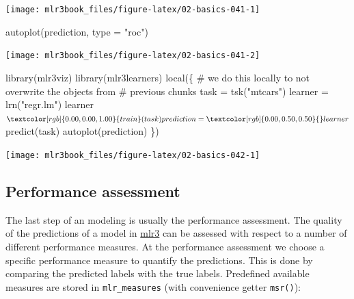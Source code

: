 \documentclass[
  11pt,
  parskip=half,
  DIV=calc,
  BCOR=10mm,
  x11names]{scrbook}
\newenvironment{Shaded}{}{}
\newcommand{\CommentTok}[1]{\textcolor[rgb]{0.00,0.50,0.00}{#1}}
\newcommand{\DataTypeTok}[1]{#1}
\newcommand{\KeywordTok}[1]{\textcolor[rgb]{0.00,0.00,1.00}{#1}}
\newcommand{\NormalTok}[1]{#1}
\newcommand{\OperatorTok}[1]{#1}
\newcommand{\StringTok}[1]{\textcolor[rgb]{0.00,0.50,0.50}{#1}}
\begin{document}
\begin{center}\texttt{[image: mlr3book\_files/figure-latex/02-basics-041-1]} \end{center}

\begin{Shaded}
\begin{Highlighting}[]
\KeywordTok{autoplot}\NormalTok{(prediction, }\DataTypeTok{type =} \StringTok{"roc"}\NormalTok{)}
\end{Highlighting}
\end{Shaded}

\begin{center}\texttt{[image: mlr3book\_files/figure-latex/02-basics-041-2]} \end{center}

\begin{Shaded}
\begin{Highlighting}[]
\KeywordTok{library}\NormalTok{(mlr3viz)}
\KeywordTok{library}\NormalTok{(mlr3learners)}
\KeywordTok{local}\NormalTok{(\{}
  \CommentTok{# we do this locally to not overwrite the objects from}
  \CommentTok{# previous chunks}
\NormalTok{  task =}\StringTok{ }\KeywordTok{tsk}\NormalTok{(}\StringTok{"mtcars"}\NormalTok{)}
\NormalTok{  learner =}\StringTok{ }\KeywordTok{lrn}\NormalTok{(}\StringTok{"regr.lm"}\NormalTok{)}
\NormalTok{  learner}\OperatorTok{$}\KeywordTok{train}\NormalTok{(task)}
\NormalTok{  prediction =}\StringTok{ }\NormalTok{learner}\OperatorTok{$}\KeywordTok{predict}\NormalTok{(task)}
  \KeywordTok{autoplot}\NormalTok{(prediction)}
\NormalTok{\})}
\end{Highlighting}
\end{Shaded}

\begin{center}\texttt{[image: mlr3book\_files/figure-latex/02-basics-042-1]} \end{center}

\hypertarget{measure}{%
\subsection{Performance assessment}\label{measure}}

The last step of an modeling is usually the performance assessment.
The quality of the predictions of a model in \href{https://mlr3.mlr-org.com}{mlr3} can be assessed with respect to a number of different performance measures.
At the performance assessment we choose a specific performance measure to quantify the predictions.
This is done by comparing the predicted labels with the true labels.
Predefined available measures are stored in \texttt{mlr\_measures} (with convenience getter \texttt{msr()}):
\end{document}
